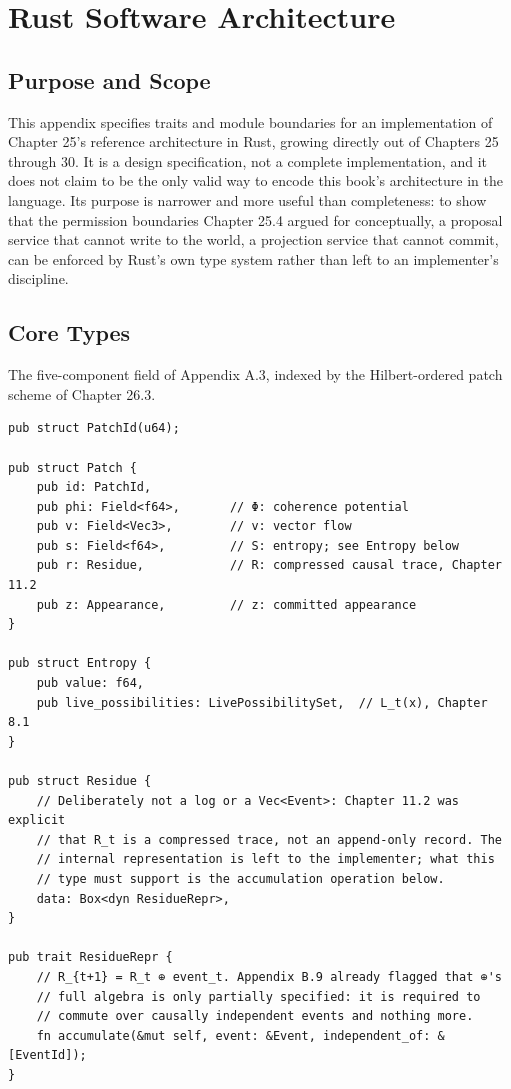 \chapter{Rust Software Architecture}

\section{Purpose and Scope}

This appendix specifies traits and module boundaries for an implementation of Chapter 25's reference architecture in Rust, growing directly out of Chapters 25 through 30. It is a design specification, not a complete implementation, and it does not claim to be the only valid way to encode this book's architecture in the language. Its purpose is narrower and more useful than completeness: to show that the permission boundaries Chapter 25.4 argued for conceptually, a proposal service that cannot write to the world, a projection service that cannot commit, can be enforced by Rust's own type system rather than left to an implementer's discipline.

\section{Core Types}

The five-component field of Appendix A.3, indexed by the Hilbert-ordered patch scheme of Chapter 26.3.

\begin{Verbatim}[breaklines=true, breaksymbolleft={}, fontsize=\small]
pub struct PatchId(u64);

pub struct Patch {
    pub id: PatchId,
    pub phi: Field<f64>,       // Φ: coherence potential
    pub v: Field<Vec3>,        // v: vector flow
    pub s: Field<f64>,         // S: entropy; see Entropy below
    pub r: Residue,            // R: compressed causal trace, Chapter 11.2
    pub z: Appearance,         // z: committed appearance
}

pub struct Entropy {
    pub value: f64,
    pub live_possibilities: LivePossibilitySet,  // L_t(x), Chapter 8.1
}

pub struct Residue {
    // Deliberately not a log or a Vec<Event>: Chapter 11.2 was explicit
    // that R_t is a compressed trace, not an append-only record. The
    // internal representation is left to the implementer; what this
    // type must support is the accumulation operation below.
    data: Box<dyn ResidueRepr>,
}

pub trait ResidueRepr {
    // R_{t+1} = R_t ⊕ event_t. Appendix B.9 already flagged that ⊕'s
    // full algebra is only partially specified: it is required to
    // commute over causally independent events and nothing more.
    fn accumulate(&mut self, event: &Event, independent_of: &[EventId]);
}
\end{Verbatim}

